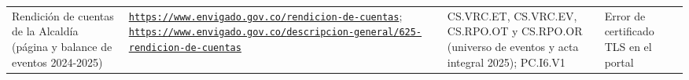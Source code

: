 \documentclass[11pt,letterpaper]{article}
\begin{document}
{\begin{xltabular}{\linewidth}{L{3.6cm}YL{3cm}L{3cm}}
Rendición de cuentas de la Alcaldía (página y balance de eventos 2024-2025) & \texttt{\footnotesize \href{https://www.envigado.gov.co/rendicion-de-cuentas}{https:/\allowbreak{}}\allowbreak{}\href{https://www.envigado.gov.co/rendicion-de-cuentas}{/\allowbreak{}}\allowbreak{}\href{https://www.envigado.gov.co/rendicion-de-cuentas}{www.\allowbreak{}envigado.\allowbreak{}gov.\allowbreak{}co/\allowbreak{}}\allowbreak{}\href{https://www.envigado.gov.co/rendicion-de-cuentas}{rendicion-\allowbreak{}de-\allowbreak{}cuentas}}; \newline \texttt{\footnotesize \href{https://www.envigado.gov.co/descripcion-general/625-rendicion-de-cuentas}{https:/\allowbreak{}}\allowbreak{}\href{https://www.envigado.gov.co/descripcion-general/625-rendicion-de-cuentas}{/\allowbreak{}}\allowbreak{}\href{https://www.envigado.gov.co/descripcion-general/625-rendicion-de-cuentas}{www.\allowbreak{}envigado.\allowbreak{}gov.\allowbreak{}co/\allowbreak{}}\allowbreak{}\href{https://www.envigado.gov.co/descripcion-general/625-rendicion-de-cuentas}{descripcion-\allowbreak{}general/\allowbreak{}}\allowbreak{}\href{https://www.envigado.gov.co/descripcion-general/625-rendicion-de-cuentas}{625-\allowbreak{}rendicion-\allowbreak{}de-\allowbreak{}cuentas}} & CS.VRC.ET, CS.VRC.EV, CS.RPO.OT y CS.RPO.OR (universo de eventos y acta integral 2025); PC.I6.V1 & Error de certificado TLS en el portal \\

\end{xltabular}}
\end{document}
